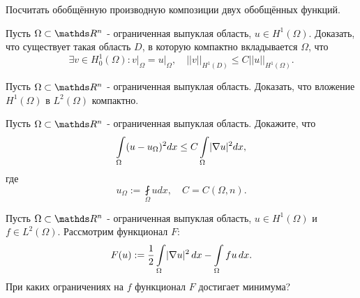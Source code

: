 \begin{exercise}
Посчитать обобщённую производную композиции двух обобщённых функций.
\end{exercise}

\begin{exercise}
Пусть $\Omega \subset \real^n$ - ограниченная выпуклая область, $u \in H^1(\Omega)$. Доказать, что существует такая область $D$, в которую компактно вкладывается $\Omega$, что
$$\exists v \in H_0^1(\Omega): v\Big\rvert_{\Omega} = u\Big\rvert_{\Omega}, \quad || v ||_{H^1(D)} \leq C || u ||_{H^1(\Omega)}.$$
\end{exercise}

\begin{exercise}
Пусть $\Omega \subset \real^n$ - ограниченная выпуклая область. Доказать, что вложение $H^1(\Omega)$ в $L^2 (\Omega)$ компактно.
\end{exercise}

\begin{exercise}
Пусть $\Omega \subset \real^n$ - ограниченная выпуклая область. Докажите, что
$$ \int \limits_{\Omega} (u - u_{\Omega})^2 dx \leq C \int \limits_{\Omega} \lvert\nabla u\rvert^2 dx, $$
где
$$ u_{\Omega} := \fint \limits_{\Omega} u dx, \quad C = C(\Omega,n).$$
\end{exercise}

\begin{exercise}
Пусть $\Omega \subset \real^n$ - ограниченная выпуклая область, $u \in H^1(\Omega)$ и $f \in L^2(\Omega)$. Рассмотрим функционал $F$:
$$ F(u) := \frac {1} {2} \int \limits_{\Omega} \lvert\nabla u\rvert^2 \, dx - \int \limits_{\Omega} fu \, dx.$$
При каких ограничениях на $f$ функционал $F$ достигает минимума? 
\end{exercise}